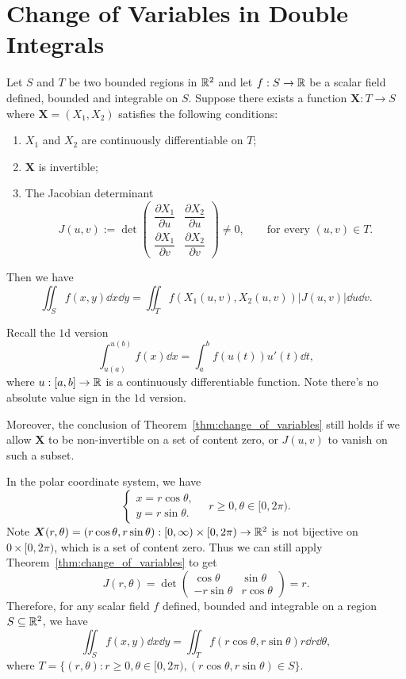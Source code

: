 \section{Change of Variables in Double Integrals}
\begin{theoremenv}\label{thm:change_of_variables}
    Let $S$ and $T$ be two bounded regions in $\mathbb{R}^2$ and let $f: S \to \mathbb{R}$ be a scalar field defined, bounded and integrable on $S$. Suppose there exists a function $\bm X: T \to S$ where $\bm X = (X_1, X_2)$ satisfies the following conditions:
    \begin{enumerate}[label=(\arabic*)]
        \item $X_1$ and $X_2$ are continuously differentiable on $T$;
        \item $\bm X$ is invertible;
        \item The Jacobian determinant
        $$ J(u,v) := \det \begin{pmatrix} \dfrac{\partial X_1}{\partial u} & \dfrac{\partial X_2}{\partial u}\\[6pt] \dfrac{\partial X_1}{\partial v} & \dfrac{\partial X_2}{\partial v} \end{pmatrix} \ne 0,\qquad \text{for every } (u,v) \in T. $$
    \end{enumerate}
    Then we have
    $$ \iint_S f(x,y) \dd x \dd y = \iint_T f(X_1(u,v), X_2(u,v)) |J(u,v)| \dd u \dd v. $$
\end{theoremenv}
\begin{remarkenv}
    Recall the $1$d version
    $$
    \int_{u(a)}^{u(b)} f(x) \dd x = \int_a^b f(u(t)) u'(t) \dd t,
    $$
    where $u: [a,b] \to \mathbb{R}$ is a continuously differentiable function. Note there's no absolute value sign in the $1$d version. 

    Moreover, the conclusion of Theorem~\ref{thm:change_of_variables} still holds if we allow $\bm X$ to be non-invertible on a set of content zero, or $J(u,v)$ to vanish on such a subset.
\end{remarkenv}
\begin{exampleenv}
    In the polar coordinate system, we have
    $$ \begin{cases}
    x = r \cos \theta,\\
    y = r \sin \theta.
    \end{cases}
    \quad r \geq 0, \theta \in [0, 2\pi). $$
    Note $\bm X(r,\theta) = (r \cos \theta, r \sin \theta): [0,\infty) \times [0,2\pi) \to \mathbb{R}^2$ is not bijective on ${0} \times [0,2\pi)$, which is a set of content zero. Thus we can still apply Theorem~\ref{thm:change_of_variables} to get
    \[
    J(r,\theta) = \det \begin{pmatrix} \cos \theta & \sin \theta \\[6pt] -r \sin \theta & r \cos \theta \end{pmatrix} = r.
    \]
    Therefore, for any scalar field $f$ defined, bounded and integrable on a region $S\subseteq \mathbb{R}^2$, we have
    \[
    \iint_S f(x,y) \dd x \dd y = \iint_T f(r \cos \theta, r \sin \theta) r \dd r \dd \theta,
    \]
    where $T = \{(r,\theta) : r \geq 0, \theta \in [0,2\pi), (r \cos \theta, r \sin \theta) \in S\}$.
\end{exampleenv}
